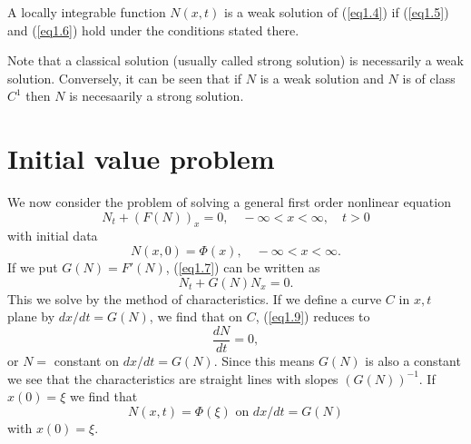 \begin{defi*}
A locally integrable function $N(x,t)$ is a weak solution of (\ref{eq1.4}) if (\ref{eq1.5}) and (\ref{eq1.6}) hold under the conditions stated there.
\end{defi*}

Note that a classical solution (usually called strong solution) is necessarily a weak solution. Conversely, it can be seen that if $N$ is a weak solution and $N$ is of  class $C^1$ then $N$ is necesaarily a strong solution.

\section{Initial value problem}\label{chap1:sec1.3}
We now consider the problem of solving a general first order nonlinear equation
\begin{equation*}
N_t + (F(N))_x = 0, \quad - \infty < x < \infty, \quad t > 0
\tag{1.7}\label{eq1.7}
\end{equation*}\pageoriginale
with initial data
\begin{equation*}
N(x,0) = \Phi (x), \quad - \infty < x < \infty. \tag{1.8}\label{eq1.8}
\end{equation*}
If we put $G(N) = F'(N)$, (\ref{eq1.7}) can be written as 
\begin{equation*}
N_t + G(N) N_x = 0. \tag{1.9}\label{eq1.9}
\end{equation*}
This we solve by the method of characteristics. If we define a curve $C$ in $x,t$ plane by $dx/dt = G(N)$, we find that on $C$, (\ref{eq1.9}) reduces to 
$$
\frac{dN}{dt} =0,
$$
or $N = $ constant on $dx/dt = G(N) $. Since this means $G(N)$ is also a constant we see that the characteristics are straight lines with slopes $(G(N))^{-1}$. If $x(0) = \xi$ we find that 
$$
N(x,t) = \Phi (\xi) \text{ on } dx/ dt = G(N)
$$
with $x(0) = \xi$. 

